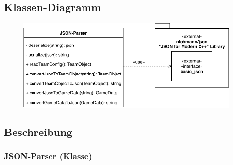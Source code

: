 \subsection{Klassen-Diagramm}
	\begin{figure}[H]
        \centering
        \includegraphics[scale=1]{images/JSON-Parser.pdf}
    \end{figure}

\subsection{Beschreibung}
	\subsubsection{JSON-Parser (Klasse)}
	
